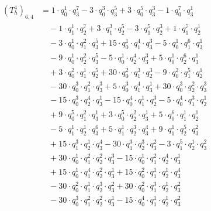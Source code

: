 \begin{align*}(T_{h}^4)_{6,4}&=1\cdot q_0^{1}\cdot q_3^{7}-3\cdot q_0^{3}\cdot q_3^{5}+3\cdot q_0^{5}\cdot q_3^{3}-1\cdot q_0^{7}\cdot q_3^{1}\\
&\quad -1\cdot q_1^{1}\cdot q_2^{7}+3\cdot q_1^{3}\cdot q_2^{5}-3\cdot q_1^{5}\cdot q_2^{3}+1\cdot q_1^{7}\cdot q_2^{1}\\
&\quad -3\cdot q_0^{1}\cdot q_1^{2}\cdot q_3^{5}+15\cdot q_0^{1}\cdot q_1^{4}\cdot q_3^{3}-5\cdot q_0^{1}\cdot q_1^{6}\cdot q_3^{1}\\
&\quad -9\cdot q_0^{1}\cdot q_2^{2}\cdot q_3^{5}-5\cdot q_0^{1}\cdot q_2^{4}\cdot q_3^{3}+5\cdot q_0^{1}\cdot q_2^{6}\cdot q_3^{1}\\
&\quad +3\cdot q_0^{2}\cdot q_1^{1}\cdot q_2^{5}+30\cdot q_0^{2}\cdot q_1^{3}\cdot q_2^{3}-9\cdot q_0^{2}\cdot q_1^{5}\cdot q_2^{1}\\
&\quad -30\cdot q_0^{3}\cdot q_1^{2}\cdot q_3^{3}+5\cdot q_0^{3}\cdot q_1^{4}\cdot q_3^{1}+30\cdot q_0^{3}\cdot q_2^{2}\cdot q_3^{3}\\
&\quad -15\cdot q_0^{3}\cdot q_2^{4}\cdot q_3^{1}-15\cdot q_0^{4}\cdot q_1^{1}\cdot q_2^{3}-5\cdot q_0^{4}\cdot q_1^{3}\cdot q_2^{1}\\
&\quad +9\cdot q_0^{5}\cdot q_1^{2}\cdot q_3^{1}+3\cdot q_0^{5}\cdot q_2^{2}\cdot q_3^{1}+5\cdot q_0^{6}\cdot q_1^{1}\cdot q_2^{1}\\
&\quad -5\cdot q_1^{1}\cdot q_2^{1}\cdot q_3^{6}+5\cdot q_1^{1}\cdot q_2^{3}\cdot q_3^{4}+9\cdot q_1^{1}\cdot q_2^{5}\cdot q_3^{2}\\
&\quad +15\cdot q_1^{3}\cdot q_2^{1}\cdot q_3^{4}-30\cdot q_1^{3}\cdot q_2^{3}\cdot q_3^{2}-3\cdot q_1^{5}\cdot q_2^{1}\cdot q_3^{2}\\
&\quad +30\cdot q_0^{1}\cdot q_1^{2}\cdot q_2^{2}\cdot q_3^{3}-15\cdot q_0^{1}\cdot q_1^{2}\cdot q_2^{4}\cdot q_3^{1}\\
&\quad +15\cdot q_0^{1}\cdot q_1^{4}\cdot q_2^{2}\cdot q_3^{1}+15\cdot q_0^{2}\cdot q_1^{1}\cdot q_2^{1}\cdot q_3^{4}\\
&\quad -30\cdot q_0^{2}\cdot q_1^{1}\cdot q_2^{3}\cdot q_3^{2}+30\cdot q_0^{2}\cdot q_1^{3}\cdot q_2^{1}\cdot q_3^{2}\\
&\quad -30\cdot q_0^{3}\cdot q_1^{2}\cdot q_2^{2}\cdot q_3^{1}-15\cdot q_0^{4}\cdot q_1^{1}\cdot q_2^{1}\cdot q_3^{2}\end{align*}
